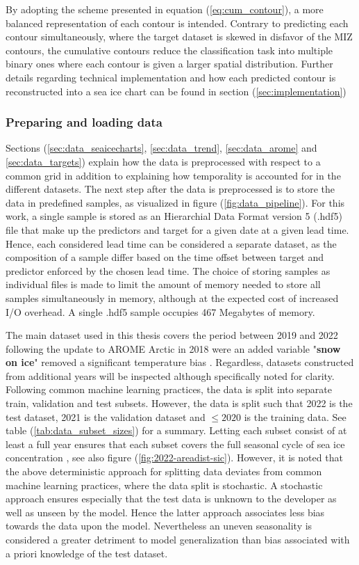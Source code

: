\documentclass[../main/thesis]{subfiles}
\begin{document}
By adopting the scheme presented in equation (\ref{eq:cum_contour}), a more balanced representation of each contour is intended. Contrary to predicting each contour simultaneously, where the target dataset is skewed in disfavor of the MIZ contours, the cumulative contours reduce the classification task into multiple binary ones where each contour is given a larger spatial distribution. Further details regarding technical implementation and how each predicted contour is reconstructed into a sea ice chart can be found in section (\ref{sec:implementation})

\subsubsection{Preparing and loading data}
\label{sec:dataloader}
Sections (\ref{sec:data_seaicecharts}, \ref{sec:data_trend}, \ref{sec:data_arome} and \ref{sec:data_targets}) explain how the data is preprocessed with respect to a common grid in addition to explaining how temporality is accounted for in the different datasets. The next step after the data is preprocessed is to store the data in predefined samples, as visualized in figure (\ref{fig:data_pipeline}). For this work, a single sample is stored as an Hierarchial Data Format version 5 (.hdf5) file that make up the predictors and target for a given date at a given lead time. Hence, each considered lead time can be considered a separate dataset, as the composition of a sample differ based on the time offset between target and predictor enforced by the chosen lead time. The choice of storing samples as individual files is made to limit the amount of memory needed to store all samples simultaneously in memory, although at the expected cost of increased I/O overhead. A single .hdf5 sample occupies 467 Megabytes of memory.

The main dataset used in this thesis covers the period between 2019 and 2022 following the update to AROME Arctic in 2018 were an added variable "\textbf{snow on ice}" removed a significant temperature bias \citep{Batrak2019}. Regardless, datasets constructed from additional years will be inspected although specifically noted for clarity. Following common machine learning practices, the data is split into separate train, validation and test subsets. However, the data is split such that 2022 is the test dataset, 2021 is the validation dataset and $\leq2020$ is the training data. See table (\ref{tab:data_subset_sizes}) for a summary. Letting each subset consist of at least a full year ensures that each subset covers the full seasonal cycle of sea ice concentration \citep{Cavalieri2012}, see also figure (\ref{fig:2022-areadist-sic}). However, it is noted that the above deterministic approach for splitting data deviates from common machine learning practices, where the data split is stochastic. A stochastic approach ensures especially that the test data is unknown to the developer as well as unseen by the model. Hence the latter approach associates less bias towards the data upon the model. Nevertheless an uneven seasonality is considered a greater detriment to model generalization than bias associated with a priori knowledge of the test dataset.
\end{document}
